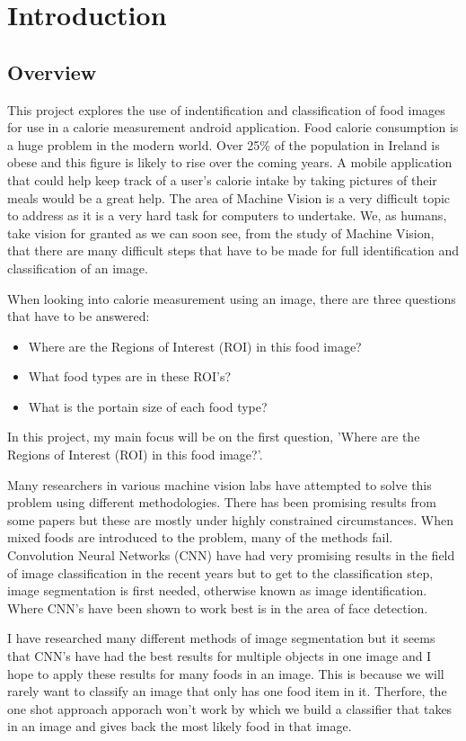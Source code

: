 \chapter{Introduction}
\label{intro}

\section{Overview}
This project explores the use of indentification and classification of food images for use in a calorie measurement android application.
Food calorie consumption is a huge problem in the modern world.
Over 25\% of the population in Ireland is obese and this figure is likely to rise over the coming years.
A mobile application that could help keep track of a user's calorie intake by taking pictures of their meals would be a great help.
The area of Machine Vision is a very difficult topic to address as it is a very hard task for computers to undertake.
We, as humans, take vision for granted as we can soon see, from the study of Machine Vision, that there are many difficult steps that have to be made for full identification and classification of an image.

When looking into calorie measurement using an image, there are three questions that have to be answered:
\begin{itemize}
\item{Where are the Regions of Interest (ROI) in this food image?}
\item{What food types are in these ROI's?}
\item{What is the portain size of each food type?}
\end{itemize}
In this project, my main focus will be on the first question, 'Where are the Regions of Interest (ROI) in this food image?'.

Many researchers in various machine vision labs have attempted to solve this
problem using different methodologies.
There has been promising results from some papers but these are mostly under highly constrained circumstances.
When mixed foods are introduced to the problem, many of the methods fail.
Convolution Neural Networks (CNN) have had very promising results in the field of image classification in the recent years but to get to the classification step, image segmentation is first needed, otherwise known as image identification.
Where CNN's have been shown to work best is in the area of face detection.

I have researched many different methods of image segmentation but it seems that CNN's have had the best results for multiple objects in one image and I hope to apply these results for many foods in an image.
This is because we will rarely want to classify an image that only has one food
item in it. Therfore, the one shot approach apporach won't work by which we
build a classifier that takes in an image and gives back the most likely food in
that image.

